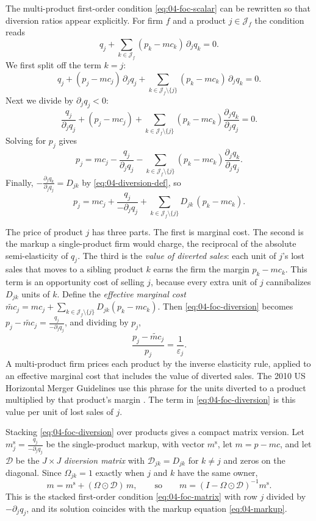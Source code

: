 The multi-product first-order condition \eqref{eq:04-foc-scalar} can be rewritten so that diversion ratios
appear explicitly. For firm $f$ and a product $j \in \mathcal{J}_f$ the condition reads
\[
  q_j + \sum_{k \in \mathcal{J}_f}(p_k - mc_k)\,\partial_j q_k = 0.
\]
We first split off the term $k = j$:
\[
  q_j + (p_j - mc_j)\,\partial_j q_j + \sum_{k \in \mathcal{J}_f\setminus\{j\}}(p_k - mc_k)\,\partial_j q_k = 0.
\]
Next we divide by $\partial_j q_j < 0$:
\[
  \frac{q_j}{\partial_j q_j} + (p_j - mc_j) + \sum_{k \in \mathcal{J}_f\setminus\{j\}}(p_k - mc_k)\frac{\partial_j q_k}{\partial_j q_j} = 0.
\]
Solving for $p_j$ gives
\[
  p_j = mc_j - \frac{q_j}{\partial_j q_j} - \sum_{k \in \mathcal{J}_f\setminus\{j\}}(p_k - mc_k)\frac{\partial_j q_k}{\partial_j q_j}.
\]
Finally, $-\frac{\partial_j q_k}{\partial_j q_j} = D_{jk}$ by \eqref{eq:04-diversion-def}, so
\begin{equation}\label{eq:04-foc-diversion}
  p_j = mc_j + \frac{q_j}{-\partial_j q_j} + \sum_{k \in \mathcal{J}_f\setminus\{j\}} D_{jk}\,(p_k - mc_k).
\end{equation}

The price of product $j$ has three parts. The first is marginal cost. The second is the markup a
single-product firm would charge, the reciprocal of the absolute semi-elasticity of $q_j$. The third is the
\emph{value of diverted sales}: each unit of $j$'s lost sales that moves to a sibling product $k$ earns the
firm the margin $p_k - mc_k$. This term is an opportunity cost of selling $j$, because every extra unit of $j$
cannibalizes $D_{jk}$ units of $k$. Define the \emph{effective marginal cost}
$\widetilde{mc}_j = mc_j + \sum_{k \in \mathcal{J}_f\setminus\{j\}}D_{jk}(p_k - mc_k)$. Then
\eqref{eq:04-foc-diversion} becomes $p_j - \widetilde{mc}_j = \frac{q_j}{-\partial_j q_j}$, and dividing by
$p_j$,
\[
  \frac{p_j - \widetilde{mc}_j}{p_j} = \frac{1}{\varepsilon_j}.
\]
A multi-product firm prices each product by the inverse elasticity rule, applied to an effective marginal cost
that includes the value of diverted sales. The 2010 US Horizontal Merger Guidelines use this phrase for the units
diverted to a product multiplied by that product's margin \citep[Section 6.1, p.~21]{USDOJFTC2010}. The term in
\eqref{eq:04-foc-diversion} is this value per unit of lost sales of $j$.

Stacking \eqref{eq:04-foc-diversion} over products gives a compact matrix version. Let
$m^{\mathrm{s}}_j = \frac{q_j}{-\partial_j q_j}$ be the single-product markup, with vector $m^{\mathrm{s}}$, let
$m = p - mc$, and let $\mathcal{D}$ be the $J \times J$ \emph{diversion matrix} with $\mathcal{D}_{jk} = D_{jk}$ for
$k \neq j$ and zeros on the diagonal. Since $\Omega_{jk} = 1$ exactly when $j$ and $k$ have the same owner,
\begin{equation}\label{eq:04-markup-diversion}
  m = m^{\mathrm{s}} + (\Omega \odot \mathcal{D})\,m, \qquad\text{so}\qquad m = (I - \Omega \odot \mathcal{D})^{-1} m^{\mathrm{s}}.
\end{equation}
This is the stacked first-order condition \eqref{eq:04-foc-matrix} with row $j$ divided by $-\partial_j q_j$, and its
solution coincides with the markup equation \eqref{eq:04-markup}.

